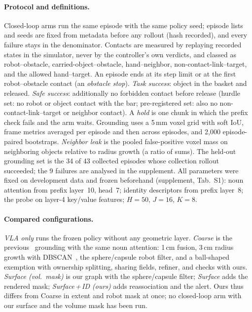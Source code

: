 \paragraph{Protocol and definitions.}
Closed-loop arms run the same episode with the same policy seed; episode lists and seeds are fixed from metadata before any rollout (hash recorded), and every failure stays in the denominator. Contacts are measured by replaying recorded states in the simulator, never by the controller's own verdicts, and classed as robot--obstacle, carried-object--obstacle, hand--neighbor, non-contact-link--target, and the allowed hand--target. An episode ends at its step limit or at the first robot--obstacle contact (an \emph{obstacle stop}). \emph{Task success}: object in the basket and released. \emph{Safe success}: additionally no forbidden contact before release (hurdle set: no robot or object contact with the bar; pre-registered set: also no non-contact-link--target or neighbor contact). A \emph{hold} is one chunk in which the prefix check fails and the arm waits. Grounding uses a 5\,mm voxel grid with soft IoU, frame metrics averaged per episode and then across episodes, and 2,000 episode-paired bootstraps. \emph{Neighbor leak} is the pooled false-positive voxel mass on neighboring objects relative to radius growth (a ratio of sums). The held-out grounding set is the 34 of 43 collected episodes whose collection rollout succeeded; the 9 failures are analysed in the supplement. All parameters were fixed on development data and frozen beforehand (supplement, Tab.~S1): noun attention from prefix layer~10, head~7; identity descriptors from prefix layer~8; the probe on layer-4 key/value features; $H=50$, $J=16$, $K=8$.

\paragraph{Compared configurations.}
\emph{VLA only} runs the frozen policy without any geometric layer. \emph{Coarse} is the previous \sys\ grounding with the same noun attention: 1\,cm fusion, 3\,cm radius growth with DBSCAN~\cite{ester1996dbscan}, the sphere/capsule robot filter, and a ball-shaped exemption with ownership splitting, sharing fields, refiner, and checks with ours. \emph{Surface (vol.\ mask)} is our graph with the sphere/capsule filter; \emph{Surface} adds the rendered mask; \emph{Surface\,+\,ID (ours)} adds reassociation and the alert. Ours thus differs from Coarse in extent and robot mask at once; no closed-loop arm with our surface and the volume mask has been run. 

